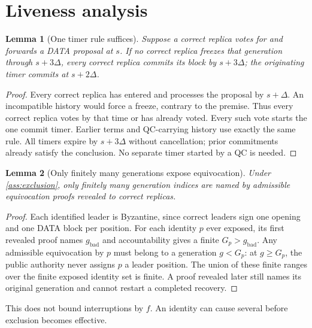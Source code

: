 \documentclass[11pt,a4paper]{article}
\newtheorem{lemma}[lemma]{Lemma}
\begin{document}
\section{Liveness analysis}
\label{sec:liveness}
\begin{lemma}[One timer rule suffices]
\label{lem:window}
Suppose a correct replica votes for and forwards a DATA proposal at $s$.
If no correct replica freezes that generation through $s+3\Delta$, every
correct replica commits its block by $s+3\Delta$; the originating timer
commits at $s+2\Delta$.
\end{lemma}
\begin{proof}
Every correct replica has entered and processes the proposal by $s+\Delta$.
An incompatible history would force a freeze, contrary to the premise.
Thus every correct replica votes by that time or has already voted.
Every such vote starts the one commit timer. Earlier terms and
QC-carrying history use exactly the same rule. All timers expire by
$s+3\Delta$ without cancellation; prior commitments already satisfy
the conclusion. No separate timer started by a QC is needed.
\end{proof}

\begin{lemma}[Only finitely many generations expose equivocation]
\label{lem:finite}
Under \cref{ass:exclusion}, only finitely many generation indices are
named by admissible equivocation proofs revealed to correct replicas.
\end{lemma}
\begin{proof}
Each identified leader is Byzantine, since correct leaders sign one
opening and one DATA block per position. For each identity $p$ ever exposed,
its first revealed proof names $g_{\mathrm{bad}}$ and accountability gives
a finite $G_p>g_{\mathrm{bad}}$. Any admissible equivocation by $p$ must
belong to a generation $g<G_p$: at $g\ge G_p$, the public authority
never assigns $p$ a leader position. The union of these finite ranges
over the finite exposed identity set is finite. A proof revealed later
still names its original generation and cannot restart a completed recovery.
\end{proof}
This does not bound interruptions by $f$. An identity can cause several
before exclusion becomes effective.
\end{document}
